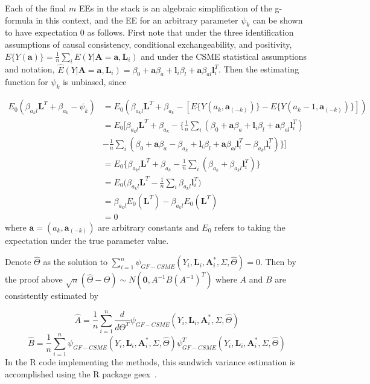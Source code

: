 \documentclass[12pt]{article}
\begin{document}
Each of the final $m$ EEs in the stack is an algebraic simplification of the g-formula in this context, and the EE for an arbitrary parameter $\psi_{k}$ can be shown to have expectation 0 as follows. First note that under the three identification assumptions of causal consistency, conditional exchangeability, and positivity, $E\{ Y(\bm{a}) \} = \frac{1}{n}\sum_{i} E(Y | \bm{A} = \bm{a}, \bm{L}_{i})$ and under the CSME statistical assumptions and notation, $\hat{E}(Y | \bm{A} = \bm{a}, \bm{L}_{i}) = \beta_{0} + \bm{a}\beta_{a} + \bm{l}_{i}\beta_{l} + \bm{a}\beta_{al}\bm{l}_{i}^{T}$. Then the estimating function for $\psi_{k}$ is unbiased, since

\begin{align*}
E_{0}(\beta_{a_{k}l}\bm{L}^{T} + \beta_{a_{k}} - \psi_{k}) &= E_{0}(\beta_{a_{k}l}\bm{L}^{T} + \beta_{a_{k}} - [E\{ Y(a_{k}, \bm{a}_{(-k)})\} - E\{ Y(a_{k} - 1, \bm{a}_{(-k)})\} ]) \\
&=E_{0}\bigg[ \beta_{a_{k}l}\bm{L}^{T} + \beta_{a_{k}} - \bigg \{ \frac{1}{n} \sum_{i} (\beta_{0} + \bm{a}\beta_{a} + \bm{l}_{i}\beta_{l} + \bm{a}\beta_{al}\bm{l}_{i}^{T}) \\
&- \frac{1}{n} \sum_{i} (\beta_{0} + \bm{a}\beta_{a} - \beta_{a_{k}} + \bm{l}_{i}\beta_{l} + \bm{a}\beta_{al}\bm{l}_{i}^{T} - \beta_{a_{k}l}\bm{l}_{i}^{T}) \bigg \} \bigg] \\
&=E_{0} \bigg \{ \beta_{a_{k}l}\bm{L}^{T} + \beta_{a_{k}} - \frac{1}{n}\sum_{i} (\beta_{a_{k}} + \beta_{a_{k}l}\bm{l}_{i}^{T}) \bigg \} \\
&=E_{0} \bigg( \beta_{a_{k}l}\bm{L}^{T} - \frac{1}{n}\sum_{i}\beta_{a_{k}l}\bm{l}_{i}^{T} \bigg) \\
&=\beta_{a_{k}l}E_{0}(\bm{L}^{T}) - \beta_{a_{k}l}E_{0}(\bm{L}^{T}) \\
&=0
\end{align*}
where $\bm{a} = (a_{k}, \bm{a}_{(-k)})$ are arbitrary constants and $E_{0}$ refers to taking the expectation under the true parameter value.

Denote $\hat{\Theta}$ as the solution to $\sum_{i=1}^{n} \psi_{GF-CSME}(Y_{i}, \bm{L}_{i}, \bm{A}^{*}_{i}, \Sigma, \hat{\Theta}) = 0$. Then by the proof above $\sqrt{n}(\hat{\Theta} - \Theta) \sim N(\textbf{0}, A^{-1}B(A^{-1})^{T})$ where $A$ and $B$ are consistently estimated by

\begin{equation*}
\hat{A} = \frac{1}{n} \sum_{i=1}^{n} \frac{d}{d\Theta^{T}} \psi_{GF-CSME}(Y_{i}, \bm{L}_{i}, \bm{A}^{*}_{i}, \Sigma, \hat{\Theta})
\end{equation*}
\begin{equation*}
\hat{B} = \frac{1}{n} \sum_{i=1}^{n} \psi_{GF-CSME}(Y_{i}, \bm{L}_{i}, \bm{A}^{*}_{i}, \Sigma, \hat{\Theta}) \psi^{T}_{GF-CSME}(Y_{i}, \bm{L}_{i}, \bm{A}^{*}_{i}, \Sigma, \hat{\Theta})
\end{equation*}
In the R code implementing the methods, this sandwich variance estimation is accomplished using the R package geex~\citep{saul2017}.
\end{document}
